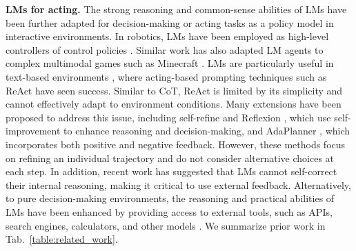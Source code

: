 \documentclass{article}
\theoremstyle{plain}
\theoremstyle{definition}
\theoremstyle{remark}
\begin{document}
\textbf{LMs for acting.} The strong reasoning and common-sense abilities of LMs have been further adapted for decision-making or acting tasks as a policy model in interactive environments. In robotics, LMs have been employed as high-level controllers of control policies \citep{ahn2022do, huang2022inner, driess2023palme}. Similar work \citep{openai2022vpt, wang2023voyager} has also adapted LM agents to complex multimodal games such as Minecraft \citep{guss2019minerl, fan2022minedojo}. LMs are particularly useful in text-based environments \citep{liu2018reinforcement,shridhar2020alfworld,liu2023agentbench}, where acting-based prompting techniques such as ReAct \citep{yao2023react} have seen success. Similar to CoT, ReAct is limited by its simplicity and cannot effectively adapt to environment conditions. Many extensions have been proposed to address this issue, including self-refine \citep{madaan2023selfrefine} and Reflexion \citep{shinn2023reflexion}, which use self-improvement to enhance reasoning and decision-making, and AdaPlanner \citep{sun2023adaplanner}, which incorporates both positive and negative feedback. However, these methods focus on refining an individual trajectory and do not consider alternative choices at each step. In addition, recent work \citep{huang2023large} has suggested that LMs cannot self-correct their internal reasoning, making it critical to use external feedback. Alternatively, to pure decision-making environments, the reasoning and practical abilities of LMs have been enhanced by providing access to external tools, such as APIs, search engines, calculators, and other models \citep{schick2023toolformer, shen2023hugginggpt, surís2023vipergpt}. We summarize prior work in Tab.~\ref{table:related_work}.
\end{document}
